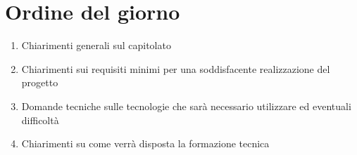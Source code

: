 \documentclass[a4paper,12pt]{article}
\begin{document}
\section{Ordine del giorno}

\begin{enumerate}
    \item Chiarimenti generali sul capitolato
    \item Chiarimenti sui requisiti minimi per una soddisfacente realizzazione del progetto
    \item Domande tecniche sulle tecnologie che sarà necessario utilizzare ed eventuali difficoltà
    \item Chiarimenti su come verrà disposta la formazione tecnica

\end{enumerate}
\end{document}
